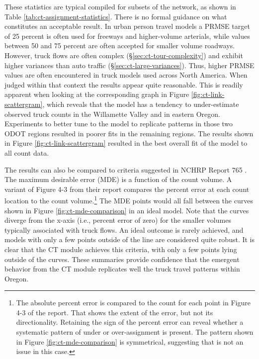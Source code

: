 \noindent These statistics are typical compiled for subsets of the network, as shown in Table \ref{tab:ct-assignment-statistics}. There is no formal guidance on what constitutes an acceptable result. In urban person travel models a PRMSE target of 25 percent is often used for freeways and higher-volume arterials, while values between 50 and 75 percent are often accepted for smaller volume roadways. However, truck flows are often complex (\S\ref{sec:ct-tour-complexity}) and exhibit higher variances than auto traffic (\S\ref{sec:ct-large-variances}). Thus, higher PRMSE values are often encountered in truck models used across North America. When judged within that context the results appear quite reasonable. This is readily apparent when looking at the corresponding graph in Figure \ref{fig:ct-link-scattergram}, which reveals that the model has a tendency to under-estimate observed truck counts in the Willamette Valley and in eastern Oregon. Experiments to better tune to the model to replicate patterns in those two ODOT regions resulted in poorer fits in the remaining regions. The results shown in Figure \ref{fig:ct-link-scattergram} resulted in the best overall fit of the model to all count data. 

The results can also be compared to criteria suggested in NCHRP Report 765 \citep{cdmsmith14}. The maximum desirable error (MDE) is a function of the count volume. A variant of Figure 4-3 from their report compares the percent error at each count location to the count volume.\footnote{The absolute percent error is compared to the count for each point in Figure 4-3 of the report. That shows the extent of the error, but not its directionality. Retaining the sign of the percent error can reveal whether a systematic pattern of under or over-assignment is present. The pattern shown in Figure \ref{fig:ct-mde-comparison} is symmetrical, suggesting that is not an issue in this case.} The MDE points would all fall between the curves shown in Figure \ref{fig:ct-mde-comparison} in an ideal model. Note that the curves diverge from the x-axis (i.e.,  percent error of zero) for the smaller volumes typically associated with truck flows. An ideal outcome is rarely achieved, and models with only a few points outside of the line are considered quite robust. It is clear that the CT module achieves this criteria, with only a few points lying outside of the curves. These summaries provide confidence that the emergent behavior from the CT module replicates well the truck travel patterns within Oregon.



